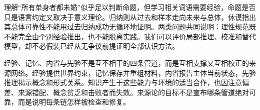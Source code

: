 理解“所有单身者都未婚”似乎足以判断命题，但学习相关词语需要经验，命题是否只是语言约定又取决于意义理论。归纳则从过去和样本走向未来与总体，休谟指出其总体可靠性不能用过去归纳成功无循环地证明\parencite[sec.~4]{hume2000}。两类问题共同说明：理性规范既不能完全由个别经验推出，也不能脱离实践。我们可以评价局部推理、校准和替代模型，却不必假装已经从无争议前提证明全部认识方法。

经验、记忆、内省与先验不是互不相干的四条管道，而是互相支撑又互相校正的来源网络。经验提供世界约束，记忆保存并重组材料，内省报告主体当前状态，先验推理揭示概念和形式关系。知识产生于这些能力与环境的适当合作，也因注意偏差、来源错配、概念贫乏和击败者而失效。来源论的目标不是宣布哪条管道绝对可靠，而是说明每条链怎样被检查和修复。
